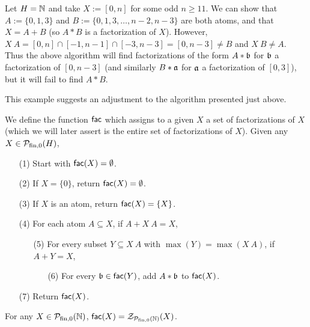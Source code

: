 \begin{eg}
	Let $H = \NN$ and take $X := [ 0,n ]$ for some odd $n \ge 11$.
	We can show that $A := \{0,1,3\}$ and $B := \{0,1,3,\dots,n-2,n-3\}$ are both atoms, and that $X = A + B$ (so $A*B$ is a factorization of $X$).
	However, $X\:A = [ 0,n ] \cap [ -1,n-1 ] \cap [ -3,n-3 ] = [ 0,n-3 ] \neq B$ and $X\: B \neq A$.
	Thus the above algorithm will find factorizations of the form $A*\bb$ for $\bb$ a factorization of $[ 0,n-3 ]$ (and similarly $B*\aa$ for $\aa$ a factorization of $[ 0,3 ]$), but it will fail to find $A*B$.
\end{eg} 

This example suggests an adjustment to the algorithm presented just above.

\begin{defn} \label{def:fac algorithm}
	We define the function $\alg{fac}$ which assigns to a given $X$ a set of factorizations of $X$ (which we will later assert is the entire set of factorizations of $X$).
	Given any $X\in \P_\fon(H)$,
	\begin{itemize}
		\item[(1)] Start with $\alg{fac}(X) = \emptyset$.
		\item[(2)] If $X = \{0\}$, return $\alg{fac}(X) = \emptyset$.
		\item[(3)] If $X$ is an atom, return $\alg{fac}(X) = \{X\}$. 
		\item[(4)] For each atom $A \subseteq X$, if $A + X\:A = X$,
		\begin{itemize}
			\item[(5)] For every subset $Y \subseteq X\:A$ with $\max(Y) = \max(X\:A)$, if $A+Y = X$,
			\begin{itemize}
				\item[(6)] For every $\bb\in \alg{fac}(Y)$, add $A*\bb$ to $\alg{fac}(X)$.
			\end{itemize}
		\end{itemize}
		\item[(7)] Return $\alg{fac}(X)$.
	\end{itemize}
\end{defn}

\begin{prop}
	For any $X\in \PN$, $\alg{fac}(X) = \Z_{\PN}(X)$.
\end{prop}

